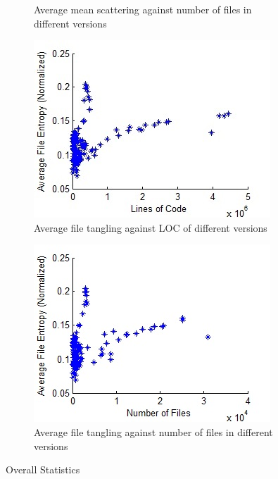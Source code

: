 \documentclass[12pt]{article}
\begin{document}
\begin{figure}
\begin{subfigure}[b]{0.5\textwidth}
                \caption{Average mean scattering against number of files in different versions}
                \label{overall-scatter2}
        \end{subfigure}
        \begin{subfigure}[b]{0.5\textwidth}
                \centering
                \includegraphics[width=\textwidth]{average-tangling-vs-loc-overall.jpg}
                \caption{Average file tangling against LOC of different versions}
                \label{overall-tangle1}
        \end{subfigure}%
        \begin{subfigure}[b]{0.5\textwidth}
                \centering
                \includegraphics[width=\textwidth]{average-tangling-vs-num-files-overall.jpg}
                \caption{Average file tangling against number of files in different versions}
                \label{overall-tangle2}
        \end{subfigure}
        \caption{Overall Statistics}\label{fig:overall}
\end{figure}
\end{document}
